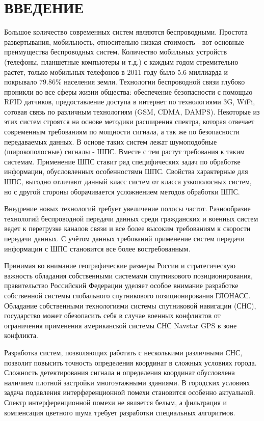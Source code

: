 \section*{ВВЕДЕНИЕ}

Большое количество современных систем являются беспроводными. Простота развертывания, мобильность, относительно низкая
стоимость - вот основные преимущества беспроводных систем. Количество мобильных устройств (телефоны, планшетные компьютеры
и т.д.) с каждым годом стремительно растет, только мобильных телефонов в 2011 году было 5.6 миллиарда и покрывало 79.86\%
\cite{wiki_mobilenum} населения земли. Технологии беспроводной связи глубоко проникли во все сферы жизни общества:
обеспечение безопасности с помощью RFID датчиков, предоставление доступа в интернет по технологиями 3G, WiFi, 
сотовая связь по различным технологиям (GSM, CDMA, DAMPS). Некоторые из этих систем строятся на основе методики
расширения спектра, которая отвечает современным требованиям по мощности сигнала, а так же по безопасности передаваемых
данных. В основе таких систем лежат шумоподобные (широкополосные) сигналы - ШПС. Вместе с тем растут требования к таким
системам. Применение ШПС ставит ряд специфических задач по обработке информации, обусловленных особенностями ШПС.
Свойства характерные для ШПС, выгодно отличают данный класс систем от класса узкополосных систем, но с другой стороны
оборачивается усложнением методов обработки ШПС.

Внедрение новых технологий требует увеличение полосы частот. Разнообразие технологий беспроводной передачи данных среди
гражданских и военных систем ведет к перегрузке каналов связи и все более высоким требованиям к скорости передачи
данных. С учётом данных требований применение систем передачи информации с ШПС становится все более востребованным.

Принимая во внимание географические размеры России и стратегическую важность обладания собственными системами спутникового
позиционирования, правительство Российский Федерации уделяет особое внимание разработке собственной системы
глобального спутникового позиционирования ГЛОНАСС. Обладание собственными технологиями системы спутниковой навигации (СНС), государство может обезопасить
себя в случае военных конфликтов от ограничения применения американской системы СНС Navstar GPS в зоне конфликта.

Разработка систем, позволяющих работать с несколькими различными СНС, позволит повысить точность определения координат
в сложных условиях города. Сложность детектирования сигнала и определения координат обусловлена наличием плотной
застройки многоэтажными зданиями. В городских условиях задача подавления интерференционной помехи становится особенно
актуальной. Спектр интерференционной помехи не является белым, а фильтрация и компенсация цветного шума
требует разработки специальных алгоритмов.

